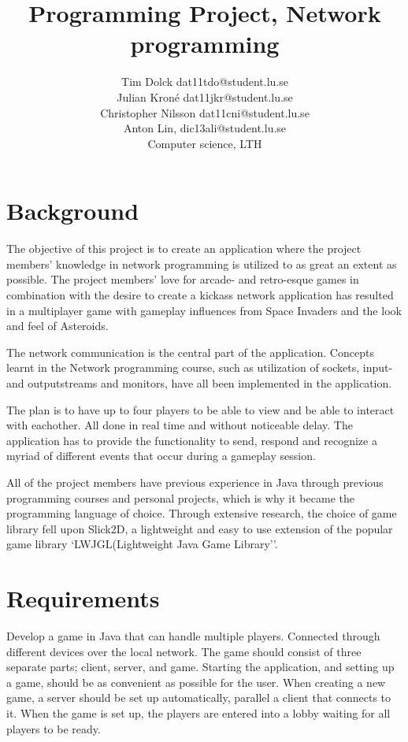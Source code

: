 \documentclass[a4paper]{article}
\title{Programming Project, Network programming}
\author{Tim Dolck dat11tdo@student.lu.se \\ 
  Julian Kron\'{e} dat11jkr@student.lu.se \\
Christopher Nilsson dat11cni@student.lu.se \\
Anton Lin, dic13ali@student.lu.se \\
Computer science, LTH}
\begin{document}
\maketitle
\newpage
\section{Background}
The objective of this project is to create an application where the project members' knowledge in network programming is utilized to as great an extent as possible. 
The project members' love for arcade- and retro-esque games in combination with the desire to create a kickass network application has resulted in a multiplayer game with gameplay influences from Space Invaders and the look and feel of Asteroids.     
 
The network communication is the central part of the application.
Concepts learnt in the Network programming course, such as utilization of sockets, input- and outputstreams and monitors, have all been implemented in the application.

The plan is to have up to four players to be able to view and be able to interact with eachother. All done in real time and without noticeable delay.
The application has to provide the functionality to send, respond and recognize a myriad of different events that occur during a gameplay session. 

 
All of the project members have previous experience in Java through previous programming courses and personal projects, which is why it became the programming language of choice.
Through extensive research, the choice of game library fell upon Slick2D, a lightweight and easy to use extension of the popular game library `LWJGL(Lightweight Java Game Library''.  


\section{Requirements}

Develop a game in Java that can handle multiple players. Connected through different devices over the local network.
The game should consist of three separate parts; client, server, and game. Starting the application, 
and setting up a game, should be as convenient as possible for the user. When creating a new game, 
a server should be set up automatically, parallel a client that connects to it.
When the game is set up, the players are entered into a lobby waiting for all players to be ready.
\end{document}
